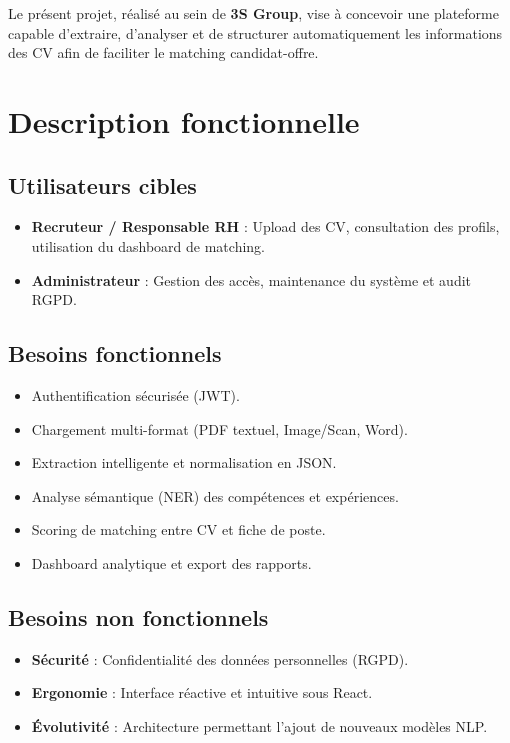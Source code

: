 \documentclass[12pt,a4paper]{report}
\begin{document}
Le présent projet, réalisé au sein de \textbf{3S Group}, vise à concevoir une plateforme capable d'extraire, d'analyser et de structurer automatiquement les informations des CV afin de faciliter le matching candidat-offre.

\chapter{Description fonctionnelle}

\section{Utilisateurs cibles}
\begin{itemize}
    \item \textbf{Recruteur / Responsable RH} : Upload des CV, consultation des profils, utilisation du dashboard de matching.
    \item \textbf{Administrateur} : Gestion des accès, maintenance du système et audit RGPD.
\end{itemize}

\section{Besoins fonctionnels}
\begin{itemize}
    \item Authentification sécurisée (JWT).
    \item Chargement multi-format (PDF textuel, Image/Scan, Word).
    \item Extraction intelligente et normalisation en JSON.
    \item Analyse sémantique (NER) des compétences et expériences.
    \item Scoring de matching entre CV et fiche de poste.
    \item Dashboard analytique et export des rapports.
\end{itemize}

\section{Besoins non fonctionnels}
\begin{itemize}
    \item \textbf{Sécurité} : Confidentialité des données personnelles (RGPD).
    \item \textbf{Ergonomie} : Interface réactive et intuitive sous React.
    \item \textbf{Évolutivité} : Architecture permettant l'ajout de nouveaux modèles NLP.
\end{itemize}
\end{document}
